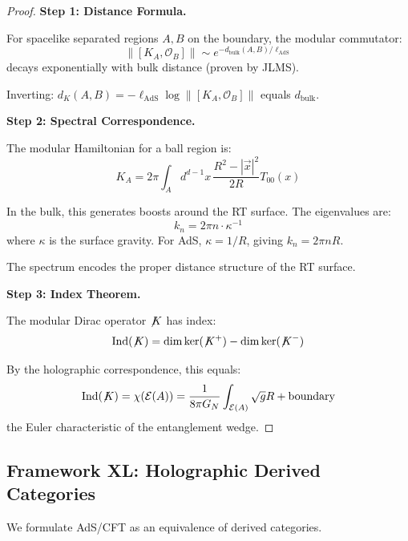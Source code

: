 \documentclass[12pt,a4paper]{article}
\providecommand{\slashed}[1]{\not\!#1}
\begin{document}
\begin{proof}
\textbf{Step 1: Distance Formula.}

For spacelike separated regions $A, B$ on the boundary, the modular commutator:
\begin{equation}
\|[K_A, \mathcal{O}_B]\| \sim e^{-d_{\text{bulk}}(A,B)/\ell_{\text{AdS}}}
\end{equation}
decays exponentially with bulk distance (proven by JLMS).

Inverting: $d_K(A,B) = -\ell_{\text{AdS}} \log \|[K_A, \mathcal{O}_B]\|$ equals $d_{\text{bulk}}$.

\textbf{Step 2: Spectral Correspondence.}

The modular Hamiltonian for a ball region is:
\begin{equation}
K_A = 2\pi \int_A d^{d-1}x \, \frac{R^2 - |\vec{x}|^2}{2R} T_{00}(x)
\end{equation}

In the bulk, this generates boosts around the RT surface. The eigenvalues are:
\begin{equation}
k_n = 2\pi n \cdot \kappa^{-1}
\end{equation}
where $\kappa$ is the surface gravity. For AdS, $\kappa = 1/R$, giving $k_n = 2\pi n R$.

The spectrum encodes the proper distance structure of the RT surface.

\textbf{Step 3: Index Theorem.}

The modular Dirac operator $\slashed{K}$ has index:
\begin{equation}
\text{Ind}(\slashed{K}) = \dim \ker(\slashed{K}^+) - \dim \ker(\slashed{K}^-)
\end{equation}

By the holographic correspondence, this equals:
\begin{equation}
\text{Ind}(\slashed{K}) = \chi(\mathcal{E}(A)) = \frac{1}{8\pi G_N} \int_{\mathcal{E}(A)} \sqrt{g} R + \text{boundary}
\end{equation}
the Euler characteristic of the entanglement wedge.
\end{proof}

\subsection{Framework XL: Holographic Derived Categories}

We formulate AdS/CFT as an equivalence of derived categories.
\end{document}
